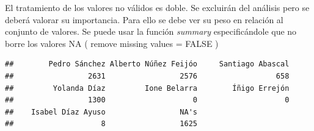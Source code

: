 \documentclass[
]{article}
\newenvironment{Shaded}{\begin{snugshade}}{\end{snugshade}}
\newcommand{\AttributeTok}[1]{\textcolor[rgb]{0.13,0.29,0.53}{#1}}
\newcommand{\ConstantTok}[1]{\textcolor[rgb]{0.56,0.35,0.01}{#1}}
\newcommand{\DecValTok}[1]{\textcolor[rgb]{0.00,0.00,0.81}{#1}}
\newcommand{\FunctionTok}[1]{\textcolor[rgb]{0.13,0.29,0.53}{\textbf{#1}}}
\newcommand{\NormalTok}[1]{#1}
\newcommand{\OtherTok}[1]{\textcolor[rgb]{0.56,0.35,0.01}{#1}}
\newcommand{\SpecialCharTok}[1]{\textcolor[rgb]{0.81,0.36,0.00}{\textbf{#1}}}
\newcommand{\StringTok}[1]{\textcolor[rgb]{0.31,0.60,0.02}{#1}}
\begin{document}
\begin{Shaded}
\end{Shaded}

El tratamiento de los valores no válidos es doble. Se excluirán del
análisis pero se deberá valorar su importancia. Para ello se debe ver su
peso en relación al conjunto de valores. Se puede usar la función
\emph{summary} especificándole que no borre los valores NA ( remove
missing values = FALSE )

\begin{Shaded}
\end{Shaded}

\begin{verbatim}
##        Pedro Sánchez Alberto Núñez Feijóo     Santiago Abascal 
##                 2631                 2576                  658 
##         Yolanda Díaz         Ione Belarra        Íñigo Errejón 
##                 1300                    0                    0 
##    Isabel Díaz Ayuso                 NA's 
##                    8                 1625
\end{verbatim}
\end{document}

